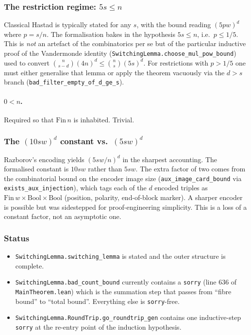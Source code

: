 \subsubsection{The restriction regime: $5s \le n$}
\label{hyp:five_s_le_n}

Classical Hastad is typically stated for any $s$, with the bound reading
$(5pw)^d$ where $p = s/n$.  The formalisation bakes in the hypothesis
$5s\le n$, i.e.\ $p\le 1/5$.  This is \emph{not} an artefact of the
combinatorics per se but of the particular inductive proof of the Vandermonde
identity (\texttt{SwitchingLemma.choose\_mul\_pow\_bound}) used to convert
$\binom{n}{s-d}(4n)^d\le \binom{n}{s}(5s)^d$.  For restrictions with $p>1/5$
one must either generalise that lemma or apply the theorem vacuously via the
$d>s$ branch (\texttt{bad\_filter\_empty\_of\_d\_ge\_s}).

\paragraph{$0<n$.}
Required so that $\mathrm{Fin}\,n$ is inhabited.  Trivial.

\subsubsection{The $(10sw)^d$ constant vs.\ $(5sw)^d$}

Razborov's encoding yields $(5sw/n)^d$ in the sharpest accounting.  The
formalised constant is $10sw$ rather than $5sw$.  The extra factor of two
comes from the combinatorial bound on the encoder image size
(\texttt{aux\_image\_card\_bound} via \texttt{exists\_aux\_injection}), which tags
each of the $d$ encoded triples as $\mathrm{Fin}\,w\times\mathrm{Bool}\times\mathrm{Bool}$
(position, polarity, end-of-block marker).  A sharper encoder is possible but
was sidestepped for proof-engineering simplicity.  This is a loss of a
constant factor, not an asymptotic one.

\subsubsection{Status}

\begin{itemize}
  \item \texttt{SwitchingLemma.switching\_lemma} is stated and the outer
        structure is complete.
  \item \texttt{SwitchingLemma.bad\_count\_bound} currently contains a
        \texttt{sorry} (line 636 of \texttt{MainTheorem.lean}) which is the
        summation step that passes from ``fibre bound'' to ``total bound''.
        Everything else is \texttt{sorry}-free.
  \item \texttt{SwitchingLemma.RoundTrip.go\_roundtrip\_gen} contains one
        inductive-step \texttt{sorry} at the re-entry point of the induction
        hypothesis.
\end{itemize}

